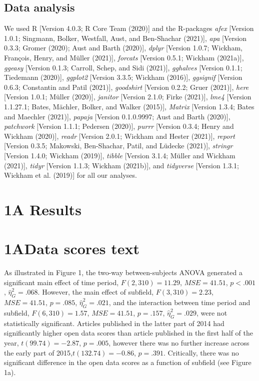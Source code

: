 \documentclass[
  english,
  man]{apa6}
\begin{document}
\hypertarget{data-analysis}{%
\subsection{Data analysis}\label{data-analysis}}

We used R {[}Version 4.0.3; R Core Team (2020){]} and the R-packages \emph{afex} {[}Version 1.0.1; Singmann, Bolker, Westfall, Aust, and Ben-Shachar (2021){]}, \emph{apa} {[}Version 0.3.3; Gromer (2020); Aust and Barth (2020){]}, \emph{dplyr} {[}Version 1.0.7; Wickham, François, Henry, and Müller (2021){]}, \emph{forcats} {[}Version 0.5.1; Wickham (2021a){]}, \emph{ggeasy} {[}Version 0.1.3; Carroll, Schep, and Sidi (2021){]}, \emph{gghalves} {[}Version 0.1.1; Tiedemann (2020){]}, \emph{ggplot2} {[}Version 3.3.5; Wickham (2016){]}, \emph{ggsignif} {[}Version 0.6.3; Constantin and Patil (2021){]}, \emph{goodshirt} {[}Version 0.2.2; Gruer (2021){]}, \emph{here} {[}Version 1.0.1; Müller (2020){]}, \emph{janitor} {[}Version 2.1.0; Firke (2021){]}, \emph{lme4} {[}Version 1.1.27.1; Bates, Mächler, Bolker, and Walker (2015){]}, \emph{Matrix} {[}Version 1.3.4; Bates and Maechler (2021){]}, \emph{papaja} {[}Version 0.1.0.9997; Aust and Barth (2020){]}, \emph{patchwork} {[}Version 1.1.1; Pedersen (2020){]}, \emph{purrr} {[}Version 0.3.4; Henry and Wickham (2020){]}, \emph{readr} {[}Version 2.0.1; Wickham and Hester (2021){]}, \emph{report} {[}Version 0.3.5; Makowski, Ben-Shachar, Patil, and Lüdecke (2021){]}, \emph{stringr} {[}Version 1.4.0; Wickham (2019){]}, \emph{tibble} {[}Version 3.1.4; Müller and Wickham (2021){]}, \emph{tidyr} {[}Version 1.1.3; Wickham (2021b){]}, and \emph{tidyverse} {[}Version 1.3.1; Wickham et al. (2019){]} for all our analyses.

\hypertarget{a-results}{%
\section{1A Results}\label{a-results}}

\hypertarget{adata-scores-text}{%
\section{1AData scores text}\label{adata-scores-text}}

As illustrated in Figure 1, the two-way between-subjects ANOVA generated a significant main effect of time period, \(F(2, 310) = 11.29\), \(\mathit{MSE} = 41.51\), \(p < .001\), \(\hat{\eta}^2_G = .068\). However, the main effect of subfield, \(F(3, 310) = 2.23\), \(\mathit{MSE} = 41.51\), \(p = .085\), \(\hat{\eta}^2_G = .021\), and the interaction between time period and subfield, \(F(6, 310) = 1.57\), \(\mathit{MSE} = 41.51\), \(p = .157\), \(\hat{\eta}^2_G = .029\), were not statistically significant. Articles published in the latter part of 2014 had significantly higher open data scores than article published in the first half of the year, \(t(99.74) = -2.87\), \(p = .005\), however there was no further increase across the early part of 2015,\(t(132.74) = -0.86\), \(p = .391\). Critically, there was no significant difference in the open data scores as a function of subfield (see Figure 1a).
\end{document}
